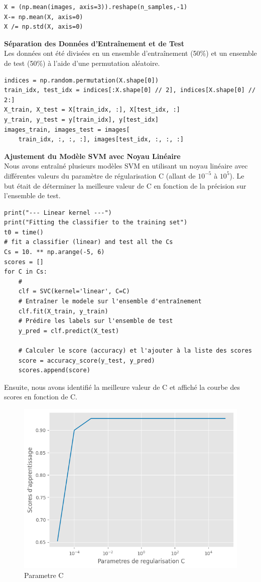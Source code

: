 \documentclass[12pt,a4paper]{report}
\begin{document}
 \begin{lstlisting}
X = (np.mean(images, axis=3)).reshape(n_samples,-1)
X-= np.mean(X, axis=0)
X /= np.std(X, axis=0)
 \end{lstlisting}
 
\textbf{ Séparation des Données d’Entraînement et de Test\\}
Les données ont été divisées en un ensemble d’entraînement (50\%) et un ensemble de test (50\%) à l’aide d’une permutation aléatoire. 

\begin{lstlisting}
indices = np.random.permutation(X.shape[0])
train_idx, test_idx = indices[:X.shape[0] // 2], indices[X.shape[0] // 2:]
X_train, X_test = X[train_idx, :], X[test_idx, :]
y_train, y_test = y[train_idx], y[test_idx]
images_train, images_test = images[
    train_idx, :, :, :], images[test_idx, :, :, :]  
\end{lstlisting}
\textbf{ Ajustement du Modèle SVM avec Noyau Linéaire\\}
 Nous avons entraîné plusieurs modèles SVM en utilisant un noyau linéaire avec
 différentes valeurs du paramètre de régularisation C (allant de $10^{-5}$ à $10^5$). Le but
 était de déterminer la meilleure valeur de C en fonction de la précision sur l’ensemble
 de test.
\begin{lstlisting}
print("--- Linear kernel ---")
print("Fitting the classifier to the training set")
t0 = time()
# fit a classifier (linear) and test all the Cs
Cs = 10. ** np.arange(-5, 6)
scores = []
for C in Cs:
    # 
    clf = SVC(kernel='linear', C=C)
    # Entraîner le modele sur l'ensemble d'entraînement
    clf.fit(X_train, y_train)
    # Prédire les labels sur l'ensemble de test
    y_pred = clf.predict(X_test)
    
    # Calculer le score (accuracy) et l'ajouter à la liste des scores
    score = accuracy_score(y_test, y_pred)
    scores.append(score)   
\end{lstlisting}
Ensuite, nous avons identifié la meilleure valeur de C et affiché la courbe des scores en fonction de C.
\begin{figure}[H]
    \centering
    \includegraphics[width=1\linewidth]{images/paramC.png}
    \caption{Parametre C}
    \label{fig:placeholder}
\end{figure}
\end{document}
